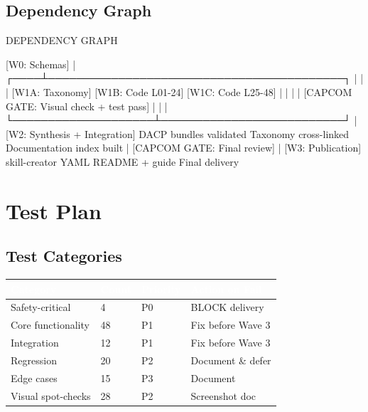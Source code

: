\documentclass[11pt,letterpaper]{article}
\newcommand{\tableheader}[1]{\textbf{\sffamily\textcolor{white}{#1}}}
\begin{document}
\subsection{Dependency Graph}

\begin{asciibox}
DEPENDENCY GRAPH

  [W0: Schemas]
       |
  ┌────┴──────────────────────────────────────────┐
  |                    |                          |
[W1A: Taxonomy]  [W1B: Code L01-24]  [W1C: Code L25-48]
  |                    |                          |
  |         [CAPCOM GATE: Visual check + test pass]
  |                    |                          |
  └────────────────────┴──────────────────────────┘
                       |
              [W2: Synthesis + Integration]
                  DACP bundles validated
                  Taxonomy cross-linked
                  Documentation index built
                       |
              [CAPCOM GATE: Final review]
                       |
              [W3: Publication]
                  skill-creator YAML
                  README + guide
                  Final delivery
\end{asciibox}

\section{Test Plan}

\subsection{Test Categories}

\begin{center}
\begin{tabularx}{\textwidth}{L{3.5cm}C{1.5cm}L{2cm}X}
\toprule
{}
\tableheader{Category} & \tableheader{Count} & \tableheader{Priority} & \tableheader{Action on Fail} \\
\midrule
Safety-critical & 4 & P0 & BLOCK delivery \\
Core functionality & 48 & P1 & Fix before Wave 3 \\
Integration & 12 & P1 & Fix before Wave 3 \\
Regression & 20 & P2 & Document \& defer \\
Edge cases & 15 & P3 & Document \\
Visual spot-checks & 28 & P2 & Screenshot doc \\
\bottomrule
\end{tabularx}
\end{center}
\end{document}
